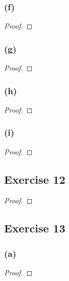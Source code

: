\documentclass[14pt]{extarticle}
\begin{document}
\subsubsection{(f)}

\begin{proof}

\end{proof}

\subsubsection{(g)}

\begin{proof}

\end{proof}

\subsubsection{(h)}

\begin{proof}

\end{proof}

\subsubsection{(i)}

\begin{proof}

\end{proof}

\subsection{Exercise 12}

\begin{proof}

\end{proof}

\subsection{Exercise 13}

\subsubsection{(a)}

\begin{proof}

\end{proof}
\end{document}
